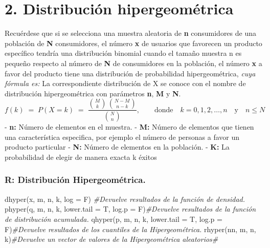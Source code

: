 \documentclass[
]{article}
\newenvironment{Shaded}{\begin{snugshade}}{\end{snugshade}}
\newcommand{\AttributeTok}[1]{\textcolor[rgb]{0.77,0.63,0.00}{#1}}
\newcommand{\CommentTok}[1]{\textcolor[rgb]{0.56,0.35,0.01}{\textit{#1}}}
\newcommand{\FunctionTok}[1]{\textcolor[rgb]{0.00,0.00,0.00}{#1}}
\newcommand{\NormalTok}[1]{#1}
\begin{document}
\hypertarget{distribuciuxf3n-hipergeomuxe9trica}{%
\section{2. Distribución
hipergeométrica}\label{distribuciuxf3n-hipergeomuxe9trica}}

Recuérdese que si se selecciona una muestra aleatoria de \textbf{n}
consumidores de una población de \textbf{N} consumidores, el número
\textbf{x} de usuarios que favorecen un producto específico tendría una
distribución binomial cuando el tamaño muestra n es pequeño respecto al
número de \textbf{N} de consumidores en la población, el número
\textbf{x} a favor del producto tiene una distribución de probabilidad
hipergeométrica, \emph{cuya fórmula es:} \pagebreak La correspondiente
distribución de X se conoce con el nombre de distribución
hipergeométrica con parámetros \textbf{n}, \textbf{M} y \textbf{N}.
\[ f(k) \;=\; P(X=k)\;= \;  \frac{{M\choose k}\,{N-M\choose n-k}}{{N\choose n}}, \qquad  \text{donde}\quad k=0,1,2, \ldots, n \quad \text{y}\quad n\leq N \]
- \textbf{n:} Número de elementos en el muestra. - \textbf{M:} Número de
elementos que tienen una característica especifica, por ejemplo el
número de personas a favor un producto particular - \textbf{N:} Número
de elementos en la población. - \textbf{K:} La probabilidad de elegir de
manera exacta k éxitos

\hypertarget{r-distribuciuxf3n-hipergeomuxe9trica.}{%
\subsubsection{R: Distribución
Hipergeométrica.}\label{r-distribuciuxf3n-hipergeomuxe9trica.}}

\begin{Shaded}
\begin{Highlighting}[]
\FunctionTok{dhyper}\NormalTok{(x, m, n, k, }\AttributeTok{log =}\NormalTok{ F) }\CommentTok{\#Devuelve resultados de la función de densidad.}
\FunctionTok{phyper}\NormalTok{(q, m, n, k, }\AttributeTok{lower.tail =}\NormalTok{ T, }\AttributeTok{log.p =}\NormalTok{ F)}\CommentTok{\#Devuelve resultados de la función de distribución acumulada.}
\FunctionTok{qhyper}\NormalTok{(p, m, n, k, }\AttributeTok{lower.tail =}\NormalTok{ T, }\AttributeTok{log.p =}\NormalTok{ F)}\CommentTok{\#Devuelve resultados de los cuantiles de la Hipergeométrica.}
\FunctionTok{rhyper}\NormalTok{(nn, m, n, k)}\CommentTok{\#Devuelve un vector de valores de la Hipergeométrica aleatorios\#}
\end{Highlighting}
\end{Shaded}
\end{document}
